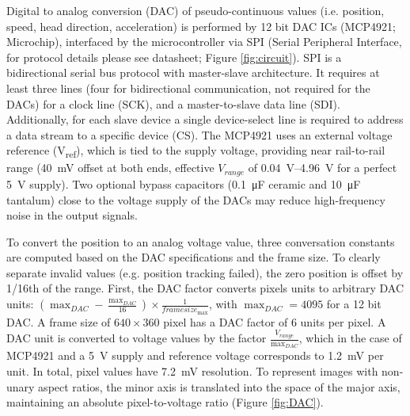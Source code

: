 Digital to analog conversion (DAC) of pseudo-continuous values (i.e. position, speed, head direction, acceleration) is performed by 12 bit DAC ICs (MCP4921; Microchip), interfaced by the microcontroller via SPI (Serial Peripheral Interface, for protocol details please see datasheet; Figure \ref{fig:circuit}). SPI is a bidirectional serial bus protocol with master-slave architecture. It requires at least three lines (four for bidirectional communication, not required for the DACs) for a clock line (SCK), and a master-to-slave data line (SDI). Additionally, for each slave device a single device-select line is required to address a data stream to a specific device (CS). The MCP4921 uses an external voltage reference (V\textsubscript{ref}), which is tied to the supply voltage, providing near rail-to-rail range (\SI{40}{\milli\volt} offset at both ends, effective $V_{range}$ of \SIrange{0.04}{4.96}{\volt} for a perfect \SI{5}{\volt} supply). Two optional bypass capacitors (\SI{0.1}{\micro\farad} ceramic and \SI{10}{\micro\farad} tantalum) close to the voltage supply of the DACs may reduce high-frequency noise in the output signals.

To convert the position to an analog voltage value, three conversation constants are computed based on the DAC specifications and the frame size. To clearly separate invalid values (e.g. position tracking failed), the zero position is offset by 1/16th of the range. First, the DAC factor converts pixels units to arbitrary DAC units: $(\max_{DAC}-\frac{\max_{DAC}}{16})\times \frac{1}{framesize_{\max}}$, with $\max_{DAC}=4095$ for a 12 bit DAC. A frame size of $640\times360$ pixel has a DAC factor of 6 units per pixel. A DAC unit is converted to voltage values by the factor $\frac{V_{range}}{\max_{DAC}}$, which in the case of MCP4921 and a \SI{5}{\volt} supply and reference voltage corresponds to \SI{1.2}{\milli\volt} per unit. In total, pixel values have \SI{7.2}{\milli\volt} resolution. To represent images with non-unary aspect ratios, the minor axis is translated into the space of the major axis, maintaining an absolute pixel-to-voltage ratio (Figure \ref{fig:DAC}).

